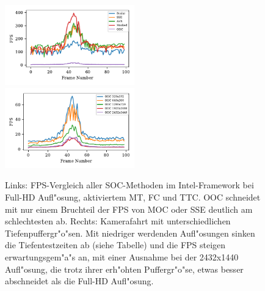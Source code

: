 \documentclass[journal]{vgtc}
\begin{document}
\begin{figure}
	\begin{minipage}{\textwidth}
		\includegraphics[width=0.5\textwidth]{images/Evaluation_1_Results_FPS.pdf}
		\includegraphics[width=0.5\textwidth]{images/Evaluation_4_Results_FPS.pdf}
	\end{minipage}
	\begin{minipage}{\textwidth}
		\centering
	\end{minipage}
	\caption{Links: FPS-Vergleich aller SOC-Methoden im Intel-Framework bei Full-HD Aufl"osung, aktiviertem MT, FC und TTC. OOC schneidet mit nur einem Bruchteil der FPS von MOC oder SSE deutlich am schlechtesten ab. Rechts: Kamerafahrt mit unterschiedlichen Tiefenpuffergr"o"sen. Mit niedriger werdenden Aufl"osungen sinken die Tiefentestzeiten ab (siehe Tabelle) und die FPS steigen erwartungsgem"a"s an, mit einer Ausnahme bei der 2432x1440 Aufl"osung, die trotz ihrer erh"ohten Puffergr"o"se, etwas besser abschneidet als die Full-HD Aufl"osung.}
	\label{fig:resolution_fps}
\end{figure}
\end{document}
